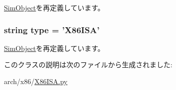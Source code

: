 \hyperlink{classm5_1_1SimObject_1_1SimObject_a17da7064bc5c518791f0c891eff05fda}{SimObject}を再定義しています。\hypertarget{classX86ISA_1_1X86ISA_acce15679d830831b0bbe8ebc2a60b2ca}{
\subsubsection[{type}]{\setlength{\rightskip}{0pt plus 5cm}string {\bf type} = '{\bf X86ISA}'}}
\label{classX86ISA_1_1X86ISA_acce15679d830831b0bbe8ebc2a60b2ca}


\hyperlink{classm5_1_1SimObject_1_1SimObject_acce15679d830831b0bbe8ebc2a60b2ca}{SimObject}を再定義しています。

このクラスの説明は次のファイルから生成されました:\begin{DoxyCompactItemize}
\item 
arch/x86/\hyperlink{X86ISA_8py}{X86ISA.py}\end{DoxyCompactItemize}
